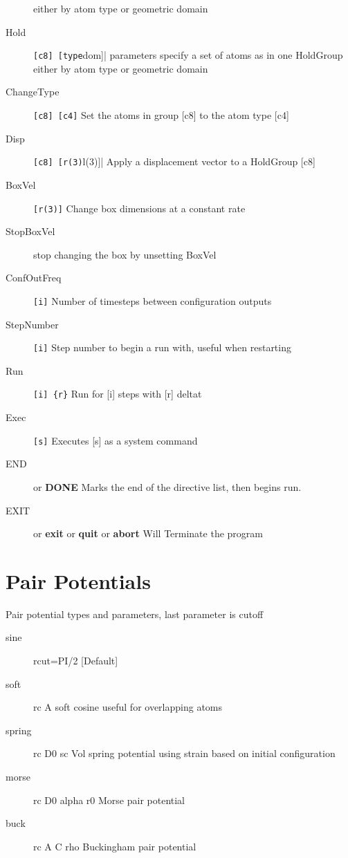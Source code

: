 \documentclass[a4paper,11pt]{scrbook}              %
\begin{document}
\begin{description}
                    either by atom type or geometric domain
\item [Hold] \verb|[c8] [type|dom]| parameters   specify a set of atoms as in one HoldGroup
                    either by atom type or geometric domain
\item [ChangeType] \verb|[c8] [c4]| Set the atoms in group [c8] to the atom type [c4]
\item [Disp] \verb|[c8] [r(3)|l(3)]| Apply a displacement vector to a HoldGroup [c8]
\item [BoxVel] \verb|[r(3)]|      Change box dimensions at a constant rate
\item [StopBoxVel]         stop changing the box by unsetting BoxVel
\item [ConfOutFreq] \verb|[i]|    Number of timesteps between configuration outputs
\item [StepNumber] \verb|[i]|     Step number to begin a run with, useful when restarting
\item [Run] \verb|[i] {r}|        Run for [i] steps with [r] deltat
\item [Exec]  \verb|[s]|          Executes [s] as a system command
\item [END] or {\bf{DONE}}        Marks the end of the directive list, then begins run.
\item [EXIT] or {\bf{exit}} or {\bf{quit}} or {\bf{abort}}    Will Terminate the program

\end{description}

\chapter{Pair Potentials}
Pair potential types and parameters, last parameter is cutoff
\begin{description}
\item [sine]               rcut=PI/2 [Default]
\item [soft] rc A          soft cosine useful for overlapping atoms
\item [spring] rc D0 sc Vol  spring potential using strain based on initial configuration
\item [morse] rc D0 alpha r0  Morse pair potential
\item [buck]  rc A C rho   Buckingham pair potential
\end{description}
\end{document}
